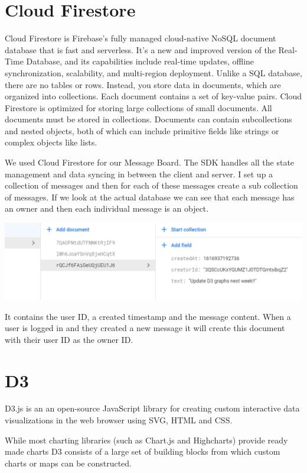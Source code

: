 \section{Cloud Firestore}
Cloud Firestore is Firebase's fully managed cloud-native NoSQL document database that is fast and serverless. It's a new and improved version of the Real-Time Database, and its capabilities include real-time updates, offline synchronization, scalability, and multi-region deployment. Unlike a SQL database, there are no tables or rows. Instead, you store data in documents, which are organized into collections. Each document contains a set of key-value pairs. 
Cloud Firestore is optimized for storing large collections of small documents.
All documents must be stored in collections. Documents can contain subcollections and nested objects, both of which can include primitive fields like strings or complex objects like lists.

We used Cloud Firestore for our Message Board.
The SDK handles all the state management and data syncing in between the client and server. I set up a collection of messages and then for each of these messages create a sub collection of messages. 
If we look at the actual database we can see that each message has an owner and then each individual message is an object.

\begin{center}    
      \includegraphics[scale=0.6]{img/FirestoreMessage.PNG}
\end{center}

It contains the user ID, a created timestamp and the message content.
When a user is logged in and they created a new message it will create this document with their user ID as the owner ID.

\section{D3}
D3.js is an an open-source JavaScript library for creating custom interactive data visualizations in the web browser using SVG, HTML and CSS. 

While most charting libraries (such as Chart.js and Highcharts) provide ready made charts D3 consists of a large set of building blocks from which custom charts or maps can be constructed.

